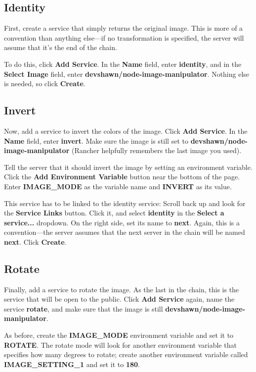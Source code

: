 \subsection*{Identity}

First, create a service that simply returns the original image. This is more of a convention than anything else---if no transformation is specified, the server will assume that it's the end of the chain.

To do this, click \textbf{Add Service}. In the \textbf{Name} field, enter \textbf{identity}, and in the \textbf{Select Image} field, enter \textbf{devshawn/node-image-manipulator}. Nothing else is needed, so click \textbf{Create}.

\subsection*{Invert}

Now, add a service to invert the colors of the image. Click \textbf{Add Service}. In the \textbf{Name} field, enter \textbf{invert}. Make sure the image is still set to \textbf{devshawn/node-image-manipulator} (Rancher helpfully remembers the last image you used).

Tell the server that it should invert the image by setting an environment variable. Click the \textbf{Add Environment Variable} button near the bottom of the page. Enter \textbf{IMAGE\_MODE} as the variable name and \textbf{INVERT} as its value.

This service has to be linked to the identity service: Scroll back up and look for the \textbf{Service Links} button. Click it, and select \textbf{identity} in the \textbf{Select a service...} dropdown. On the right side, set its name to \textbf{next}. Again, this is a convention---the server assumes that the next server in the chain will be named \textbf{next}. Click \textbf{Create}.

\subsection*{Rotate}

Finally, add a service to rotate the image. As the last in the chain, this is the service that will be open to the public. Click \textbf{Add Service} again, name the service \textbf{rotate}, and make sure that the image is still \textbf{devshawn/node-image-manipulator}.

As before, create the \textbf{IMAGE\_MODE} environment variable and set it to \textbf{ROTATE}. The rotate mode will look for another environment variable that specifies how many degrees to rotate; create another environment variable called \textbf{IMAGE\_SETTING\_1} and set it to \textbf{180}.

